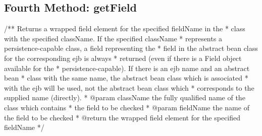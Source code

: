 \newpage
\subsection{Fourth Method: getField} 
	/** Returns a wrapped field element for the specified fieldName in the 
	 * class with the specified className.  If the specified className 
	 * represents a persistence-capable class, a field representing the 
	 * field in the abstract bean class for the corresponding ejb is always 
	 * returned (even if there is a Field object available for the 
	 * persistence-capable).  If there is an ejb name and an abstract bean
	 * class with the same name, the abstract bean class which is associated
	 * with the ejb will be used, not the abstract bean class which  
	 * corresponds to the supplied name (directly).
	 * @param className the fully qualified name of the class which contains
	 * the field to be checked
	 * @param fieldName the name of the field to be checked
	 * @return the wrapped field element for the specified fieldName
	 */
	 
